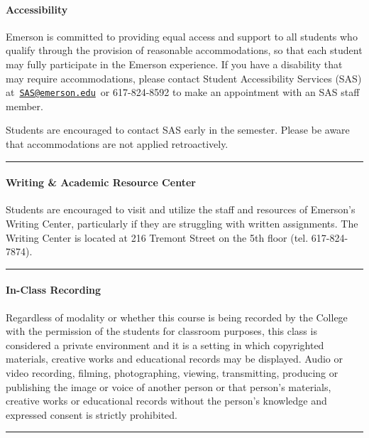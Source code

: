 \documentclass[
  letterpaper,
  DIV=11,
  numbers=noendperiod]{scrartcl}
\let\oldparagraph\paragraph
\renewcommand{\paragraph}[1]{\oldparagraph{#1}\mbox{}}
\begin{document}
\hypertarget{accessibility}{%
\paragraph{Accessibility}\label{accessibility}}

Emerson is committed to providing equal access and support to all
students who qualify through the provision of reasonable accommodations,
so that each student may fully participate in the Emerson experience. If
you have a disability that may require accommodations, please contact
Student Accessibility Services (SAS)
at~\href{mailto:SAS@emerson.edu}{\nolinkurl{SAS@emerson.edu}}~or
617-824-8592 to make an appointment with an SAS staff member.

Students are encouraged to contact SAS early in the semester. Please be
aware that accommodations are not applied retroactively.

\begin{center}\rule{0.5\linewidth}{0.5pt}\end{center}

\hypertarget{writing-academic-resource-center}{%
\paragraph{Writing \& Academic Resource
Center}\label{writing-academic-resource-center}}

Students are encouraged to visit and utilize the staff and resources of
Emerson's Writing Center, particularly if they are struggling with
written assignments. The Writing Center is located at 216 Tremont Street
on the 5th floor (tel. 617-824-7874).

\begin{center}\rule{0.5\linewidth}{0.5pt}\end{center}

\hypertarget{in-class-recording}{%
\paragraph{In-Class Recording}\label{in-class-recording}}

Regardless of modality or whether this course is being recorded by the
College with the permission of the students for classroom purposes, this
class is considered a private environment and it is a setting in which
copyrighted materials, creative works and educational records may be
displayed. Audio or video recording, filming, photographing, viewing,
transmitting, producing or publishing the image or voice of another
person or that person's materials, creative works or educational records
without the person's knowledge and expressed consent is strictly
prohibited.~

\begin{center}\rule{0.5\linewidth}{0.5pt}\end{center}
\end{document}
